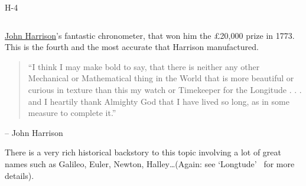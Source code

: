 \begin{myFrame}{H-4}{}
	\begin{columns}
		\setCol
		\begin{itemize}
			\col \href{http://en.wikipedia.org/wiki/John_Harrison}{John Harrison}'s fantastic chronometer, that won him the \pounds20,000 prize in 1773.
			\col This is the fourth and the most accurate that Harrison manufactured.
			\remSpace
			\begin{flushleft}\tiny
				\begin{quotation}
					``I think I may make bold to say, that there is neither any other Mechanical or Mathematical thing in the World that is more beautiful or curious in texture than this my watch or Timekeeper for the Longitude . . . and I heartily thank Almighty God that I have lived so long, as in some measure to complete it.''
				\end{quotation}
				\hfill \color{black}-- John Harrison~\cite{Sobel1995}
			\end{flushleft}
			\col There is a very rich historical backstory to this topic involving a lot of great names such as Galileo, Euler, Newton, Halley\ldots \newline (Again: see `Longtude'~\cite{Sobel1995} for more details).
		\end{itemize}
	\end{columns}
\end{myFrame}


